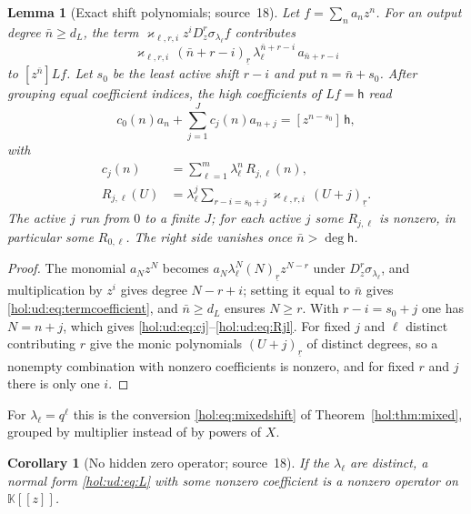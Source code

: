 \documentclass[11pt]{article}
\numberwithin{equation}{section}
\newtheorem{lemma}[theorem]{Lemma}
\newtheorem{corollary}[theorem]{Corollary}
\theoremstyle{definition}
\theoremstyle{remark}
\newcommand{\fall}[2]{(#1)_{\underline{#2}}}
\newcommand{\KK}{\mathbb K}
\begin{document}
\begin{lemma}[Exact shift polynomials; source~18]\label{hol:ud:lem:operator}
Let $f=\sum_na_nz^n$. For an output degree $\bar n\ge d_L$, the term
$\varkappa_{\ell,r,i}z^iD_z^r\sigma_{\lambda_\ell}f$ contributes
\begin{equation}\label{hol:ud:eq:termcoefficient}
 \varkappa_{\ell,r,i}\,\fall{\bar n+r-i}{r}\,\lambda_\ell^{\bar n+r-i}\,
 a_{\bar n+r-i}
\end{equation}
to $[z^{\bar n}]Lf$. Let $s_0$ be the least active shift $r-i$ and put
$n=\bar n+s_0$. After grouping equal coefficient indices, the high
coefficients of $Lf=\mathsf h$ read
\begin{equation}\label{hol:ud:eq:recurrence}
 c_0(n)a_n+\sum_{j=1}^Jc_j(n)a_{n+j}=[z^{n-s_0}]\,\mathsf h,
\end{equation}
with
\begin{align}
 c_j(n)&=\sum_{\ell=1}^m\lambda_\ell^n\,R_{j,\ell}(n),\label{hol:ud:eq:cj}\\
 R_{j,\ell}(U)&=\lambda_\ell^j\sum_{r-i=s_0+j}\varkappa_{\ell,r,i}\,
 \fall{U+j}{r}.\label{hol:ud:eq:Rjl}
\end{align}
The active $j$ run from $0$ to a finite $J$; for each active $j$ some
$R_{j,\ell}$ is nonzero, in particular some $R_{0,\ell}$. The right side
vanishes once $\bar n>\deg\mathsf h$.
\end{lemma}

\begin{proof}
The monomial $a_Nz^N$ becomes $a_N\lambda_\ell^N\fall Nrz^{N-r}$ under
$D_z^r\sigma_{\lambda_\ell}$, and multiplication by $z^i$ gives degree
$N-r+i$; setting it equal to $\bar n$ gives \eqref{hol:ud:eq:termcoefficient},
and $\bar n\ge d_L$ ensures $N\ge r$. With $r-i=s_0+j$ one has $N=n+j$, which
gives \eqref{hol:ud:eq:cj}--\eqref{hol:ud:eq:Rjl}. For fixed $j$ and $\ell$
distinct contributing $r$ give the monic polynomials $\fall{U+j}r$ of distinct
degrees, so a nonempty combination with nonzero coefficients is nonzero, and
for fixed $r$ and $j$ there is only one $i$.
\end{proof}

For $\lambda_\ell=q^\ell$ this is the conversion \eqref{hol:eq:mixedshift} of
Theorem~\ref{hol:thm:mixed}, grouped by multiplier instead of by powers of $X$.

\begin{corollary}[No hidden zero operator; source~18]
\label{hol:ud:cor:faithful}
If the $\lambda_\ell$ are distinct, a normal form \eqref{hol:ud:eq:L} with some
nonzero coefficient is a nonzero operator on $\KK[[z]]$.
\end{corollary}
\end{document}
